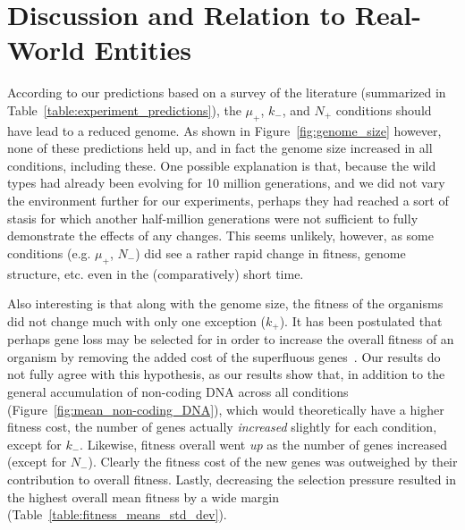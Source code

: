 \section{Discussion and Relation to Real-World Entities}\label{discussion}
According to our predictions based on a survey of the literature (summarized in Table~\ref{table:experiment_predictions}), the $\mu_+$, $k_-$, and $N_+$ conditions should have lead to a reduced genome. As shown in Figure~\ref{fig:genome_size} however, none of these predictions held up, and in fact the genome size increased in all conditions, including these. One possible explanation is that, because the wild types had already been evolving for 10 million generations, and we did not vary the environment further for our experiments, perhaps they had reached a sort of stasis for which another half-million generations were not sufficient to fully demonstrate the effects of any changes. This seems unlikely, however, as some conditions (e.g. $\mu_+$, $N_-$) did see a rather rapid change in fitness, genome structure, etc. even in the (comparatively) short time. 

Also interesting is that along with the genome size, the fitness of the organisms did not change much with only one exception ($k_+$). It has been postulated that perhaps gene loss may be selected for in order to increase the overall fitness of an organism by removing the added cost of the superfluous genes~\cite{koskiniemi2012}. Our results do not fully agree with this hypothesis, as our results show that, in addition to the general accumulation of non-coding DNA across all conditions (Figure~\ref{fig:mean_non-coding_DNA}), which would theoretically have a higher fitness cost, the number of genes actually \textit{increased} slightly for each condition, except for $k_-$. Likewise, fitness overall went \textit{up} as the number of genes increased (except for $N_-$). Clearly the fitness cost of the new genes was outweighed by their contribution to overall fitness. Lastly, decreasing the selection pressure resulted in the highest overall mean fitness by a wide margin (Table~\ref{table:fitness_means_std_dev}).

